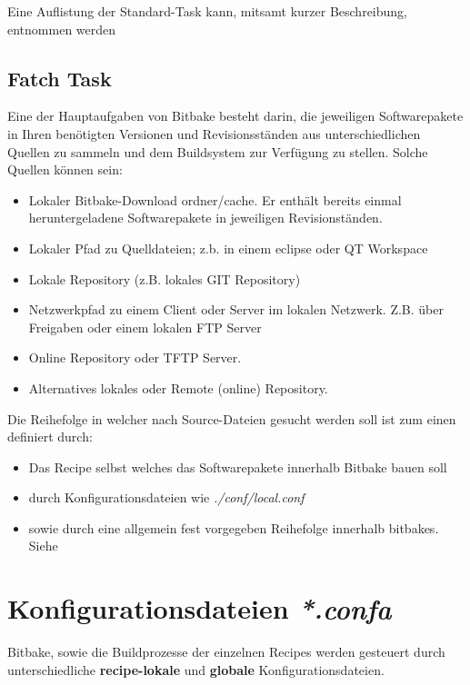 Eine Auflistung der Standard-Task kann, mitsamt kurzer Beschreibung,
entnommen werden
\cite[S. 171-172]{Gonzalez2018:Embedded_Linux_Development_Using_Yocto_Project_Cookbook_2nd}

\subsection{Fatch Task}%
\label{sub:fatch_task}
Eine der Hauptaufgaben von Bitbake besteht darin, die jeweiligen
Softwarepakete in Ihren benötigten Versionen und Revisionsständen aus
unterschiedlichen Quellen zu sammeln und dem Buildsystem zur Verfügung
zu stellen. Solche Quellen können sein:

\begin{itemize}
    \item Lokaler Bitbake-Download ordner/cache. Er enthält bereits einmal
        heruntergeladene Softwarepakete in jeweiligen Revisionständen.
    \item Lokaler Pfad zu Quelldateien; z.b. in einem eclipse oder QT Workspace
    \item Lokale Repository (z.B. lokales GIT Repository)
    \item Netzwerkpfad zu einem Client oder Server im lokalen Netzwerk. Z.B.
        über Freigaben oder einem lokalen FTP Server
    \item Online Repository oder TFTP Server.
    \item Alternatives lokales oder Remote (online) Repository.
\end{itemize}

Die Reihe\-folge in welcher nach Source-Dateien gesucht werden soll ist zum
einen definiert durch:

\begin{itemize}
    \item Das Recipe selbst welches das Software\-pakete innerhalb Bitbake bauen
        soll
    \item durch Konfigurationsdateien wie \textit{./conf/local.conf}
    \item sowie durch eine allgemein fest vorgegeben Reihefolge innerhalb
    bitbakes. Siehe
    \cite[S.53]{Gonzalez2018:Embedded_Linux_Development_Using_Yocto_Project_Cookbook_2nd}
\end{itemize}

\section{Konfigurationsdateien \textit{*.confa}}%
\label{sec:configurations_dateien_conf}
Bitbake, sowie die Buildprozesse der einzelnen Recipes
werden gesteuert durch unterschiedliche \textbf{recipe-lokale} und
\textbf{globale} Konfigurationsdateien.




